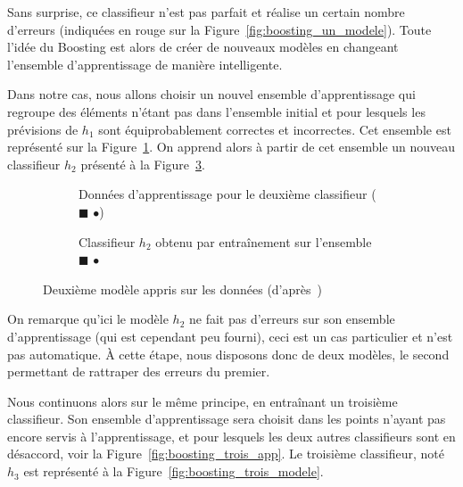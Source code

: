 Sans surprise, ce classifieur n'est pas parfait et réalise un certain nombre d'erreurs (indiquées en rouge sur la Figure~\ref{fig:boosting_un_modele}). Toute l'idée du Boosting est alors de créer de nouveaux modèles en changeant l'ensemble d'apprentissage de manière \og intelligente\fg. 

Dans notre cas, nous allons choisir un nouvel ensemble d'apprentissage qui regroupe des éléments n'étant pas dans l'ensemble initial et pour lesquels les prévisions de $h_1$ sont équiprobablement correctes et incorrectes. Cet ensemble est représenté sur la Figure~\ref{fig:boosting_deux_app}. On apprend alors à partir de cet ensemble un nouveau classifieur $h_2$ présenté à la Figure~\ref{fig:boosting_deux_modele}.

\begin{figure}[h]
	\begin{margincap}
	\begin{subfigure}{.45\textwidth}
		
		\caption{Données d'apprentissage pour le deuxième classifieur ($\blacksquare$ \large{$\bullet$})}
		\label{fig:boosting_deux_app}
	\end{subfigure}\hfill
	\begin{subfigure}{.45\textwidth}
		
		\caption{Classifieur $h_2$ obtenu par entraînement sur l'ensemble $\blacksquare$ \large{$\bullet$}}
		\label{fig:boosting_deux_modele}
	\end{subfigure}\hfill
	\caption{Deuxième modèle appris sur les données (d'après~\cite{bib:elghazel})}
	\end{margincap}
\end{figure}

On remarque qu'ici le modèle $h_2$ ne fait pas d'erreurs sur son ensemble d'apprentissage (qui est cependant peu fourni), ceci est un cas particulier et n'est pas automatique. À cette étape, nous disposons donc de deux modèles, le second permettant de \og rattraper\fg{} des erreurs du premier.

Nous continuons alors sur le même principe, en entraînant un troisième classifieur. Son ensemble d'apprentissage sera choisit dans les points n'ayant pas encore servis à l'apprentissage, et pour lesquels les deux autres classifieurs sont en désaccord, voir la Figure~\ref{fig:boosting_trois_app}. Le troisième classifieur, noté $h_3$ est représenté à la Figure~\ref{fig:boosting_trois_modele}.

